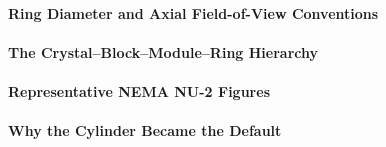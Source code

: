 \paragraph{Ring Diameter and Axial Field-of-View Conventions}

\paragraph{The Crystal--Block--Module--Ring Hierarchy}

\paragraph{Representative NEMA NU-2 Figures}

\paragraph{Why the Cylinder Became the Default}

